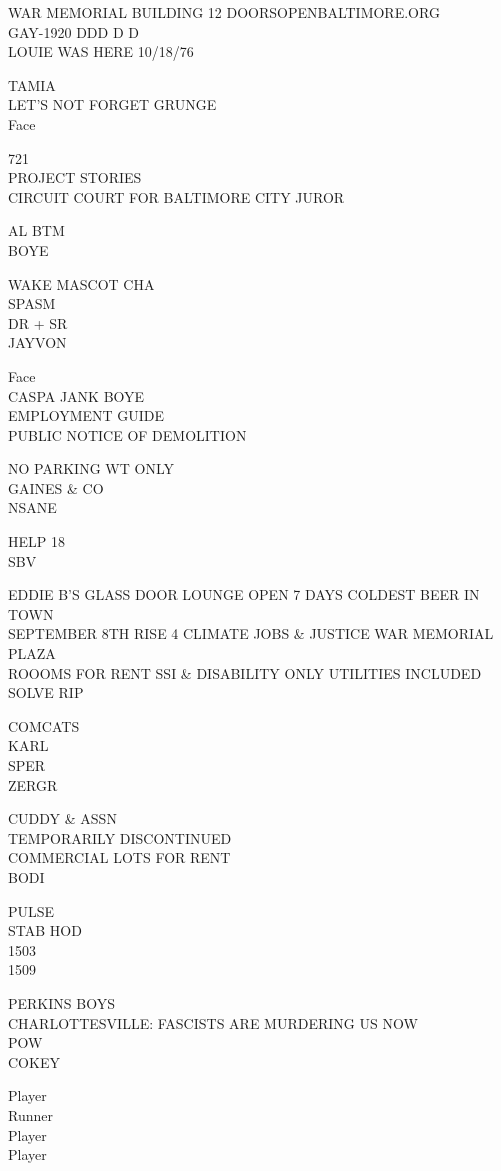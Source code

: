 \documentclass[10pt,letterpaper]{article}
\begin{document}
WAR MEMORIAL BUILDING 12 DOORSOPENBALTIMORE.ORG\\
GAY{-}1920 DDD D D\\
LOUIE WAS HERE 10/18/76

TAMIA\\
LET'S NOT FORGET GRUNGE\\
Face

721\\
PROJECT STORIES\\
CIRCUIT COURT FOR BALTIMORE CITY JUROR

AL BTM\\
BOYE

WAKE MASCOT CHA\\
SPASM\\
DR + SR\\
JAYVON

Face\\
CASPA JANK BOYE\\
EMPLOYMENT GUIDE\\
PUBLIC NOTICE OF DEMOLITION

NO PARKING WT ONLY\\
GAINES \& CO\\
NSANE

HELP 18\\
SBV

EDDIE B'S GLASS DOOR LOUNGE OPEN 7 DAYS COLDEST BEER IN TOWN\\
SEPTEMBER 8TH RISE 4 CLIMATE JOBS \& JUSTICE WAR MEMORIAL PLAZA\\
ROOOMS FOR RENT SSI \& DISABILITY ONLY UTILITIES INCLUDED\\
SOLVE RIP

COMCATS\\
KARL\\
SPER\\
ZERGR

CUDDY \& ASSN\\
TEMPORARILY DISCONTINUED\\
COMMERCIAL LOTS FOR RENT\\
BODI

PULSE\\
STAB HOD\\
1503\\
1509

PERKINS BOYS\\
CHARLOTTESVILLE: FASCISTS ARE MURDERING US NOW\\
POW\\
COKEY

Player\\
Runner\\
Player\\
Player
\end{document}
